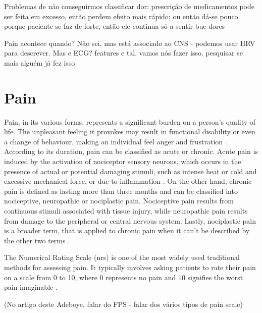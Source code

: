 Problemas de não conseguirmos classificar dor: prescrição de medicamentos pode ser feita em excesso, então perdem efeito mais rápido; ou então dá-se pouco porque paciente se faz de forte, então ele continua só a sentir bue dores

Pain acontece quando? Não sei, mas está associado ao CNS - podemos usar HRV para descrever. Mas e ECG? features e tal. vamos nós fazer isso. pesquisar se mais alguém já fez isso


\section{Pain}

Pain, in its various forms, represents a significant burden on a person's quality of life. The unpleasant feeling it provokes may result in functional disability or even a change of behaviour, making an individual feel anger and frustration \cite{Dirk2021}. According to its duration, pain can be classified as acute or chronic. Acute pain is induced by the activation of nociceptor sensory neurons, which occurs in the presence of actual or potential damaging stimuli, such as intense heat or cold and excessive mechanical force, or due to inflammation \cite{Jayakar2021}. On the other hand, chronic pain is defined as lasting more than three months \cite{Raman2022} and can be classified into nociceptive, neuropathic or nociplastic pain. Nociceptive pain results from continuous stimuli associated with tissue injury, while neuropathic pain results from damage to the peripheral or central nervous system. Lastly, nociplastic pain is a broader term, that is applied to chronic pain when it can't be described by the other two terms \cite{Fitzcharles2021}.

The Numerical Rating Scale (\ac{nrs}) is one of the most widely used traditional methods for assessing pain. It typically involves asking patients to rate their pain on a scale from 0 to 10, where 0 represents no pain and 10 signifies the worst pain imaginable \cite{Nugent2021,Adeboye2021}. 

(No artigo deste Adeboye, falar do FPS - falar dos vários tipos de pain scale)
